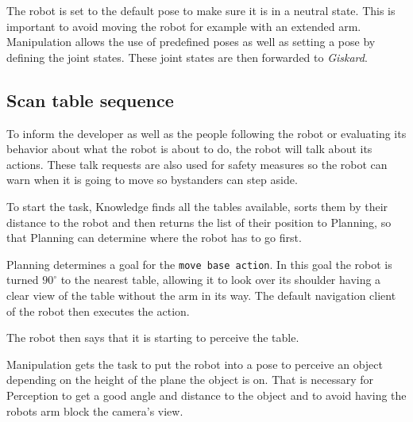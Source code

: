 \documentclass[main.tex]{subfiles}
\begin{document}
	\begin{manipulation}
	The robot is set to the default pose to make sure it is in a neutral state. This is important to avoid moving the robot for example with an extended arm. Manipulation allows the use of predefined poses as well as setting a pose by defining the joint states. These joint states are then forwarded to \textit{Giskard}.\end{manipulation}
	
	\subsection{Scan table sequence}
	
	\begin{nlp}
	To inform the developer as well as the people following the robot or evaluating its behavior about what the robot is about to do, the robot will talk about its actions. These talk requests are also used for safety measures so the robot can warn when it is going to move so bystanders can step aside. \end{nlp}
	
	\begin{knowledge}
	To start the task, Knowledge finds all the tables available, sorts them by their distance to the robot and then returns the list of their position to Planning, so that Planning can determine where the robot has to go first.\end{knowledge}
	
	\begin{navigation}
	Planning determines a goal for the \texttt{move base action}. In this goal the robot is turned $90^\circ$ to the nearest table, allowing it to look over its shoulder having a clear view of the table without the arm in its way. The default navigation client of the robot then executes the action. \end{navigation}
	
	\begin{nlp}
	The robot then says that it is starting to perceive the table.\end{nlp}
	
	\begin{manipulation}
	Manipulation gets the task to put the robot into a pose to perceive an object depending on the height of the plane the object is on.
    That is necessary for Perception to get a good angle and distance to the object and to avoid having the robots arm block the camera's view.
    \end{manipulation}
	
\end{document}
